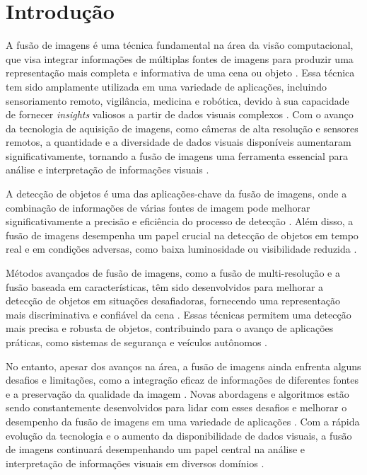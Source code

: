
\chapter{Introdução}\label{cap:introducao}



A fusão de imagens é uma técnica fundamental na área da visão computacional, que visa integrar informações de múltiplas fontes de imagens para produzir uma representação mais completa e informativa de uma cena ou objeto \cite{barnard2020}. Essa técnica tem sido amplamente utilizada em uma variedade de aplicações, incluindo sensoriamento remoto, vigilância, medicina e robótica, devido à sua capacidade de fornecer \textit{insights} valiosos a partir de dados visuais complexos \cite{xue2021}. Com o avanço da tecnologia de aquisição de imagens, como câmeras de alta resolução e sensores remotos, a quantidade e a diversidade de dados visuais disponíveis aumentaram significativamente, tornando a fusão de imagens uma ferramenta essencial para análise e interpretação de informações visuais \cite{bhattacharya2022}.

A detecção de objetos é uma das aplicações-chave da fusão de imagens, onde a combinação de informações de várias fontes de imagem pode melhorar significativamente a precisão e eficiência do processo de detecção \cite{zhu2020}. Além disso, a fusão de imagens desempenha um papel crucial na detecção de objetos em tempo real e em condições adversas, como baixa luminosidade ou visibilidade reduzida \cite{zhang2021}. 

Métodos avançados de fusão de imagens, como a fusão de multi-resolução e a fusão baseada em características, têm sido desenvolvidos para melhorar a detecção de objetos em situações desafiadoras, fornecendo uma representação mais discriminativa e confiável da cena \cite{jiang2020}. Essas técnicas permitem uma detecção mais precisa e robusta de objetos, contribuindo para o avanço de aplicações práticas, como sistemas de segurança e veículos autônomos \cite{zhu2020}.

No entanto, apesar dos avanços na área, a fusão de imagens ainda enfrenta alguns desafios e limitações, como a integração eficaz de informações de diferentes fontes e a preservação da qualidade da imagem \cite{barnard2020}. Novas abordagens e algoritmos estão sendo constantemente desenvolvidos para lidar com esses desafios e melhorar o desempenho da fusão de imagens em uma variedade de aplicações \cite{xue2021}. Com a rápida evolução da tecnologia e o aumento da disponibilidade de dados visuais, a fusão de imagens continuará desempenhando um papel central na análise e interpretação de informações visuais em diversos domínios \cite{bhattacharya2022}.

